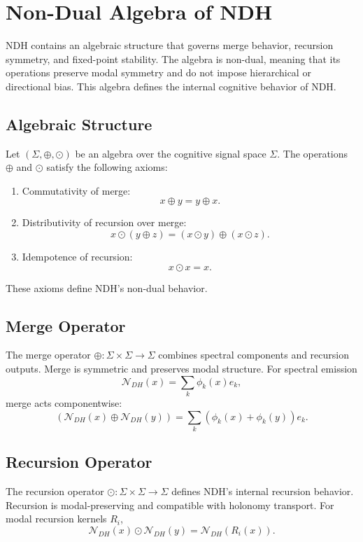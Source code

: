 \section{Non-Dual Algebra of NDH}
\label{sec:ndh-nondual-algebra}

NDH contains an algebraic structure that governs merge behavior, recursion
symmetry, and fixed-point stability. The algebra is non-dual, meaning that its
operations preserve modal symmetry and do not impose hierarchical or directional
bias. This algebra defines the internal cognitive behavior of NDH.

\subsection{Algebraic Structure}

Let $(\Sigma, \oplus, \odot)$ be an algebra over the cognitive signal space
$\Sigma$. The operations $\oplus$ and $\odot$ satisfy the following axioms:

\begin{enumerate}
\item Commutativity of merge:
\[
x \oplus y = y \oplus x.
\]

\item Distributivity of recursion over merge:
\[
x \odot (y \oplus z) = (x \odot y) \oplus (x \odot z).
\]

\item Idempotence of recursion:
\[
x \odot x = x.
\]
\end{enumerate}

These axioms define NDH's non-dual behavior.

\subsection{Merge Operator}

The merge operator $\oplus : \Sigma \times \Sigma \to \Sigma$ combines spectral
components and recursion outputs. Merge is symmetric and preserves modal
structure. For spectral emission
\[
\mathcal{N}_{DH}(x) = \sum_k \phi_k(x) e_k,
\]
merge acts componentwise:
\[
(\mathcal{N}_{DH}(x) \oplus \mathcal{N}_{DH}(y))
  = \sum_k (\phi_k(x) + \phi_k(y)) e_k.
\]

\subsection{Recursion Operator}

The recursion operator $\odot : \Sigma \times \Sigma \to \Sigma$ defines NDH's
internal recursion behavior. Recursion is modal-preserving and compatible with
holonomy transport. For modal recursion kernels $R_i$,
\[
\mathcal{N}_{DH}(x) \odot \mathcal{N}_{DH}(y)
  = \mathcal{N}_{DH}(R_i(x)).
\]

